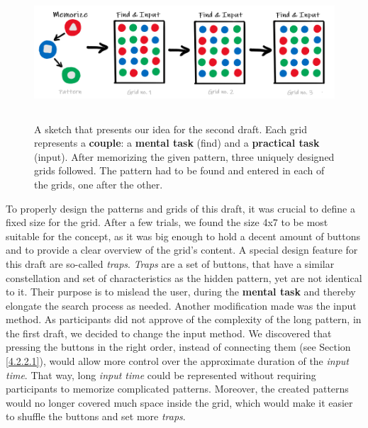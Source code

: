 \begin{figure}[t!]
\centering
\includegraphics[width=13cm, height=5cm]{Chapters/graphics/seconddraft.PNG}
\caption{A sketch that presents our idea for the second draft. Each grid represents a \textbf{couple}: a \textbf{mental task} (find) and a \textbf{practical task} (input). After memorizing the given pattern, three uniquely designed grids followed. The pattern had to be found and entered in each of the grids, one after the other.}
\label{fig:secondDraft}
\end{figure}



To properly design the patterns and grids of this draft, it was crucial to define a fixed size for the grid. After a few trials, we found the size 4x7 to be most suitable for the concept, as it was big enough to hold a decent amount of buttons and to provide a clear overview of the grid's content. A special design feature for this draft are so-called \textit{traps}. \textit{Traps} are a set of buttons, that have a similar constellation and set of characteristics as the hidden pattern, yet are not identical to it. Their purpose is to mislead the user, during the \textbf{mental task} and thereby elongate the search process as needed. Another modification made was the input method. As participants did not approve of the complexity of the long pattern, in the first draft, we decided to change the input method. We discovered that pressing the buttons in the right order, instead of connecting them (see Section \ref{4.2.2.1}), would allow more control over the approximate duration of the \textit{input time}. That way, long \textit{input time} could be represented without requiring participants to memorize complicated patterns. Moreover, the created patterns would no longer covered much space inside the grid, which would make it easier to shuffle the buttons and set more \textit{traps}. 

